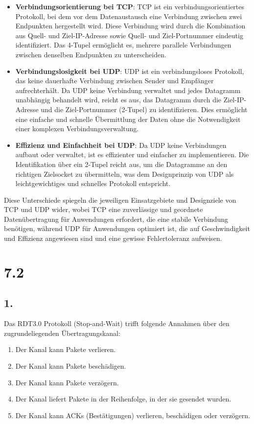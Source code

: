 \documentclass[a4paper]{scrartcl}
\newcounter{punkte}
\begin{document}
\begin{itemize}
    \item \textbf{Verbindungsorientierung bei TCP}: TCP ist ein verbindungsorientiertes Protokoll, bei dem vor dem Datenaustausch eine Verbindung zwischen zwei Endpunkten hergestellt wird. Diese Verbindung wird durch die Kombination aus Quell- und Ziel-IP-Adresse sowie Quell- und Ziel-Portnummer eindeutig identifiziert. Das 4-Tupel ermöglicht es, mehrere parallele Verbindungen zwischen denselben Endpunkten zu unterscheiden.
    
    \item \textbf{Verbindungslosigkeit bei UDP}: UDP ist ein verbindungsloses Protokoll, das keine dauerhafte Verbindung zwischen Sender und Empfänger aufrechterhält. Da UDP keine Verbindung verwaltet und jedes Datagramm unabhängig behandelt wird, reicht es aus, das Datagramm durch die Ziel-IP-Adresse und die Ziel-Portnummer (2-Tupel) zu identifizieren. Dies ermöglicht eine einfache und schnelle Übermittlung der Daten ohne die Notwendigkeit einer komplexen Verbindungsverwaltung.
    
    \item \textbf{Effizienz und Einfachheit bei UDP}: Da UDP keine Verbindungen aufbaut oder verwaltet, ist es effizienter und einfacher zu implementieren. Die Identifikation über ein 2-Tupel reicht aus, um die Datagramme an den richtigen Zielsocket zu übermitteln, was dem Designprinzip von UDP als leichtgewichtiges und schnelles Protokoll entspricht.
\end{itemize}

Diese Unterschiede spiegeln die jeweiligen Einsatzgebiete und Designziele von TCP und UDP wider, wobei TCP eine zuverlässige und geordnete Datenübertragung für Anwendungen erfordert, die eine stabile Verbindung benötigen, während UDP für Anwendungen optimiert ist, die auf Geschwindigkeit und Effizienz angewiesen sind und eine gewisse Fehlertoleranz aufweisen.
\section*{7.2}
\subsection*{1.}

Das RDT3.0 Protokoll (Stop-and-Wait) trifft folgende Annahmen über den zugrundeliegenden Übertragungskanal:

\begin{enumerate}
    \item Der Kanal kann Pakete verlieren.
    \item Der Kanal kann Pakete beschädigen.
    \item Der Kanal kann Pakete verzögern.
    \item Der Kanal liefert Pakete in der Reihenfolge, in der sie gesendet wurden.
    \item Der Kanal kann ACKs (Bestätigungen) verlieren, beschädigen oder verzögern.
\end{enumerate}
\end{document}
